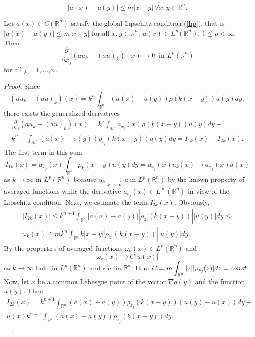 \documentclass[10pt,a4paper]{amsart}
\newcommand{\R}{{\mathbb R}}
\newcommand{\const}{{\rm const}}
\begin{document}
\begin{equation}\label{lip}
|a(x)-a(y)|\le m|x-y| \ \forall x,y\in\R^n.
\end{equation}

\begin{lemma}\label{lmDL}
Let $a(x)\in C(\R^n)$ satisfy the global Lipschitz condition (\ref{lip}), that is
$|a(x)-a(y)|\le m|x-y|$ for all $x,y\in\R^n$; $u(x)\in L^p(\R^n)$, $1\le p<\infty$. Then
\begin{equation}\label{DL}
\frac{\partial}{\partial x_j}(au_k-(au)_k)(x)\to 0 \ \mbox{ in } L^p(\R^n)
\end{equation}
for all $j=1,\ldots,n$.
\end{lemma}

\begin{proof}
Since \[(au_k-(au)_k)(x)=k^n\int_{\R^n}(a(x)-a(y))\rho(k(x-y)) u(y)dy,\]
there exists the generalized derivatives
\begin{align}\label{rel}
\frac{\partial}{\partial x_j}(au_k-(au)_k)(x)=k^n\int_{\R^n}a_{x_j}(x)\rho(k(x-y)) u(y)dy+\nonumber\\ k^{n+1}\int_{\R^n}(a(x)-a(y))\rho_{z_j}(k(x-y)) u(y)dy=I_{1k}(x)+I_{2k}(x).
\end{align}
The first term in this sum
\begin{equation}\label{rel1}
I_{1k}(x)=a_{x_j}(x)\int_{\R^n}\rho_k(x-y) u(y)dy=a_{x_j}(x)u_k(x)\to a_{x_j}(x)u(x)
\end{equation}
as $k\to\infty$ in $L^p(\R^n)$ because $u_k\mathop{\to}\limits_{k\to\infty} u$ in $L^p(\R^n)$ by the known property of averaged functions while the derivative $a_{x_j}(x)\in L^\infty(\R^n)$ in view of the Lipschitz condition.
Next, we estimate the term $I_{2k}(x)$. Obviously,
\begin{align}\label{es1}
|I_{2k}(x)|\le k^{n+1}\int_{\R^n}|a(x)-a(y)||\rho_{z_j}(k(x-y))| |u(y)|dy\le \nonumber\\ \omega_k(x)\doteq mk^n\int_{\R^n}k|x-y||\rho_{z_j}(k(x-y))| |u(y)|dy.
\end{align}
By the properties of averaged functions $\omega_k(x)\in L^p(\R^n)$ and
\begin{equation}\label{rel2}
\omega_k(x)\to C|u(x)|
\end{equation}
as $k\to\infty$ both in $L^p(\R^n)$ and a.e. in $\R^n$. Here $\displaystyle C=m\int_{\R^n} |z||\rho_{z_j}(z)|dz=\const$.
Now, let $x$ be a common Lebesgue point of the vector $\nabla a(y)$ and the function $u(y)$. Then
\begin{align}\label{rel2-1}
I_{2k}(x)=k^{n+1}\int_{\R^n}(a(x)-a(y))\rho_{z_j}(k(x-y))(u(y)-u(x))dy+\nonumber\\ u(x)k^{n+1}\int_{\R^n}(a(x)-a(y))\rho_{z_j}(k(x-y))dy.

\end{align}
\end{proof}
\end{document}
